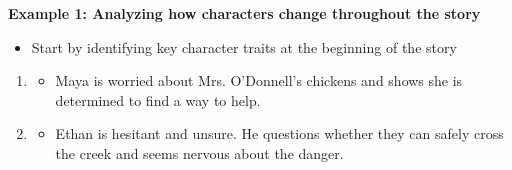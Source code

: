 \documentclass[12pt]{article}
\begin{document}
\vspace{1em}
\begin{tcolorbox}[colframe=black!60, colback=white, 
coltitle=black, colbacktitle=black!15, fonttitle=\bfseries\Large, 
title=Examples, halign title=center, left=10pt, right=10pt, top=10pt, bottom=15pt]

\textbf{Example 1: Analyzing how characters change throughout the story}


 

\begin{itemize}
    \item Start by identifying key character traits at the beginning of the story
\end{itemize}
    \begin{enumerate}
    \item 
    \begin{itemize}
        \item Maya is worried about Mrs. O’Donnell’s chickens and shows she is determined to find a way to help.
    \end{itemize}
    \item 
    \begin{itemize}
        \item Ethan is hesitant and unsure. He questions whether they can safely cross the creek and seems nervous about the danger.
    \end{itemize}
\end{enumerate}


\end{tcolorbox}
\end{document}
